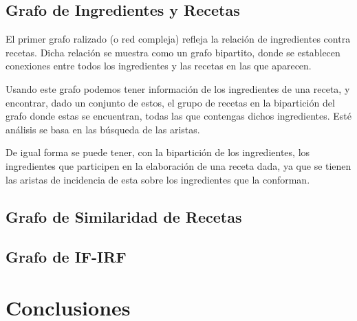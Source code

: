 \documentclass[a4paper]{article}
\begin{document}
\subsection{Grafo de Ingredientes y Recetas}\label{sub:ing-recip-graph}
El primer grafo ralizado (o red compleja) refleja la relación de ingredientes
contra recetas. Dicha relación se muestra como un grafo bipartito, donde se
establecen conexiones entre todos los ingredientes y las recetas en las que
aparecen.

Usando este grafo podemos tener información de los ingredientes de una receta,
y encontrar, dado un conjunto de estos, el grupo de recetas en la bipartición
del grafo donde estas se encuentran, todas las que contengas dichos ingredientes.
Esté análisis se basa en las búsqueda de las aristas.

De igual forma se puede tener, con la bipartición de los ingredientes, los
ingredientes que participen en la elaboración de una receta dada, ya que se
tienen las aristas de incidencia de esta sobre los ingredientes que la conforman.

\subsection{Grafo de Similaridad de Recetas}\label{sub:sim-graph}



\subsection{Grafo de IF-IRF}\label{sub:sim-graph}



\section{Conclusiones}\label{sec:conc}
\end{document}
